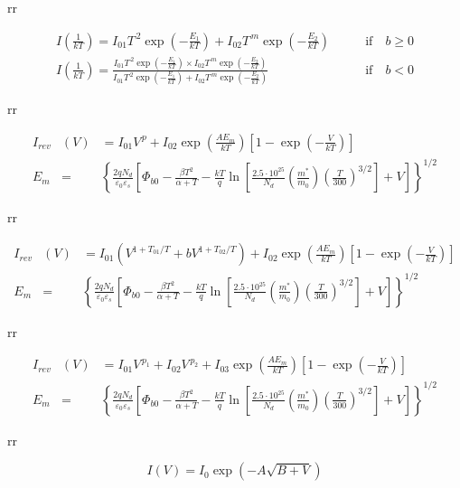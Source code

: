 \documentclass[14pt]{article}
\numberwithin{equation}{part}
\begin{document}
rr


\begin{eqnarray*}
    I\left(\frac{1}{kT}\right)=I_{01}T^{\,2}\exp\left(-\frac{E_1}{kT}\right)+
       I_{02}T^{\,m}\exp\left(-\frac{E_2}{kT}\right)& \qquad \mbox{if}\quad b\geq0 \\
    I\left(\frac{1}{kT}\right)=\frac{I_{01}T^{\,2}\exp\left(-\frac{E_1}{kT}\right)\times I_{02}T^{\,m}\exp\left(-\frac{E_2}{kT}\right)}
    {I_{01}T^{\,2}\exp\left(-\frac{E_1}{kT}\right)+ I_{02}T^{\,m}\exp\left(-\frac{E_2}{kT}\right)}&\qquad \mbox{if}\quad b<0
\end{eqnarray*}


rr


\begin{eqnarray*}
    I_{rev}&(V)&=I_{01}V^{\,p}+I_{02}\exp\left(\frac{AE_m}{kT}\right)\left[1-\exp\left(-\frac{V}{kT}\right)\right] \\
    E_m&=&\left\{\frac{2qN_d}{\varepsilon_0\varepsilon_s}\left[\Phi_{b0}-\frac{\beta T^2}{\alpha+T}-\frac{kT}{q}\ln\left[\frac{2.5\cdot10^{25}}{N_d}\left(\frac{m^*}{m_0}\right)
     \left(\frac{T}{300}\right)^{3/2}\right]+V\right]\right\}^{1/2}
\end{eqnarray*}


rr


\begin{eqnarray*}
    I_{rev}&(V)&=I_{01}\left(V^{1+T_{01}/T}+bV^{1+T_{02}/T}\right)+I_{02}\exp\left(\frac{AE_m}{kT}\right)\left[1-\exp\left(-\frac{V}{kT}\right)\right] \\
    E_m&=&\left\{\frac{2qN_d}{\varepsilon_0\varepsilon_s}\left[\Phi_{b0}-\frac{\beta T^2}{\alpha+T}-\frac{kT}{q}\ln\left[\frac{2.5\cdot10^{25}}{N_d}\left(\frac{m^*}{m_0}\right)
     \left(\frac{T}{300}\right)^{3/2}\right]+V\right]\right\}^{1/2}
\end{eqnarray*}


rr


\begin{eqnarray*}
    I_{rev}&(V)&=I_{01}V^{\,p_1}+I_{02}V^{\,p_2}+I_{03}\exp\left(\frac{AE_m}{kT}\right)\left[1-\exp\left(-\frac{V}{kT}\right)\right] \\
    E_m&=&\left\{\frac{2qN_d}{\varepsilon_0\varepsilon_s}\left[\Phi_{b0}-\frac{\beta T^2}{\alpha+T}-\frac{kT}{q}\ln\left[\frac{2.5\cdot10^{25}}{N_d}\left(\frac{m^*}{m_0}\right)
     \left(\frac{T}{300}\right)^{3/2}\right]+V\right]\right\}^{1/2}
\end{eqnarray*}


rr


\begin{equation*}
    I(V)=I_0\exp\left(-A\sqrt{B+V}\right)
\end{equation*}
\end{document}
